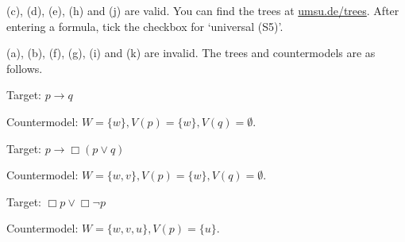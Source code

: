 \begin{solution}
  (c), (d), (e), (h) and (j) are valid. You can find the trees at
  \href{https://www.umsu.de/trees/}{umsu.de/trees}. After entering a formula,
  tick the checkbox for `universal (S5)'.

  (a), (b), (f), (g), (i) and (k) are invalid. The trees and countermodels are as
  follows.
                
  \begin{sollist}
  \item[(a)] Target: $p\to q$
  

    Countermodel: $W = \{ w \}, V(p) = \{ w \}, V(q) = \emptyset$.
    
    \medskip

  \item[(b)] Target: $p \to \Box(p \lor q)$


    Countermodel: $W = \{ w, v \}, V(p) = \{ w \}, V(q) = \emptyset$.

  \medskip
  \item[(f)] Target: $\Box p \lor \Box \neg p$
    

    Countermodel: $W = \{ w,v,u \}, V(p) = \{ u \}$.
    

\end{sollist}
\end{solution}
